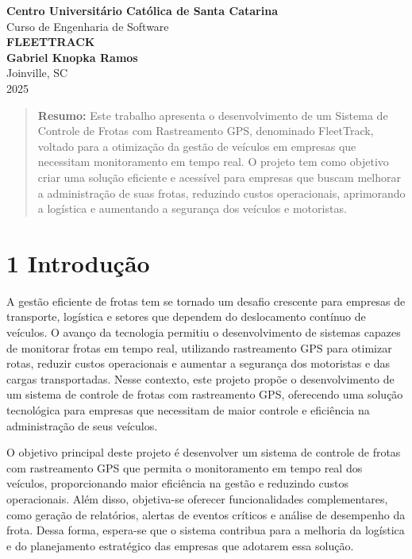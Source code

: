 \documentclass[12pt]{article}
\begin{document}
\begin{titlepage}
    \centering

    {\Huge \textbf{Centro Universitário Católica de Santa Catarina}}\\[1.5cm]
    {\Large Curso de Engenharia de Software}\\[4cm]
    {\huge \textbf{FLEETTRACK}}\\[2cm]
    {\Large \textbf{Gabriel Knopka Ramos}}\\[6cm]
    {\Large Joinville, SC}\\[1.5cm]
    {\Large 2025}

    \vfill


\end{titlepage}

\newpage

\begin{abstract}
    \noindent \textbf{Resumo:} Este trabalho apresenta o desenvolvimento de um Sistema de Controle de Frotas com Rastreamento GPS, denominado FleetTrack, voltado para a otimização da gestão de veículos em empresas que necessitam monitoramento em tempo real. O projeto tem como objetivo criar uma solução eficiente e acessível para empresas que buscam melhorar a administração de suas frotas, reduzindo custos operacionais, aprimorando a logística e aumentando a segurança dos veículos e motoristas.
\end{abstract}

\vspace{1cm}

\section*{1 Introdução}
A gestão eficiente de frotas tem se tornado um desafio crescente para empresas de transporte, logística e setores que dependem do deslocamento contínuo de veículos. O avanço da tecnologia permitiu o desenvolvimento de sistemas capazes de monitorar frotas em tempo real, utilizando rastreamento GPS para otimizar rotas, reduzir custos operacionais e aumentar a segurança dos motoristas e das cargas transportadas. Nesse contexto, este projeto propõe o desenvolvimento de um sistema de controle de frotas com rastreamento GPS, oferecendo uma solução tecnológica para empresas que necessitam de maior controle e eficiência na administração de seus veículos.

O objetivo principal deste projeto é desenvolver um sistema de controle de frotas com rastreamento GPS que permita o monitoramento em tempo real dos veículos, proporcionando maior eficiência na gestão e reduzindo custos operacionais. Além disso, objetiva-se oferecer funcionalidades complementares, como geração de relatórios, alertas de eventos críticos e análise de desempenho da frota. Dessa forma, espera-se que o sistema contribua para a melhoria da logística e do planejamento estratégico das empresas que adotarem essa solução.
\end{document}
